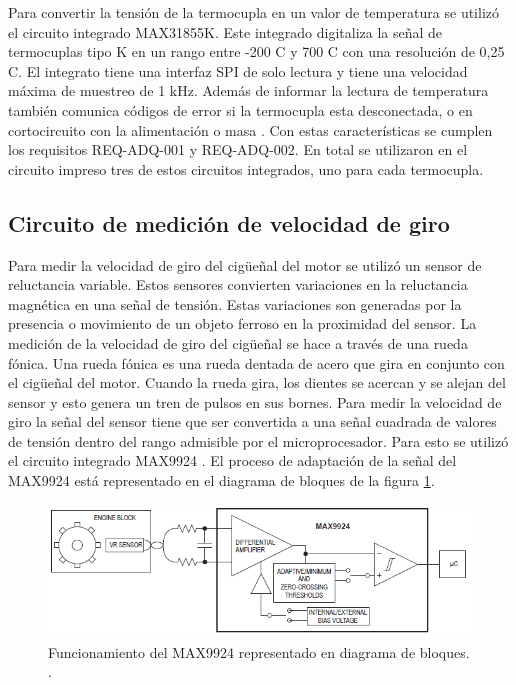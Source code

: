 Para convertir la tensión de la termocupla en un valor de temperatura se utilizó el circuito integrado MAX31855K. Este integrado digitaliza la señal de termocuplas tipo K en un rango entre -200 \degree C y 700 \degree C con una resolución de 0,25 \degree C. El integrato tiene una interfaz SPI de solo lectura y tiene una velocidad máxima de muestreo de 1 kHz. Además de informar la lectura de temperatura también comunica códigos de error si la termocupla esta desconectada, o en cortocircuito con la alimentación o masa \cite{MAX31855}. Con estas características se cumplen los requisitos REQ-ADQ-001 y REQ-ADQ-002. En total se utilizaron en el circuito impreso tres de estos circuitos integrados, uno para cada termocupla.

\subsection{Circuito de medición de velocidad de giro}

Para medir la velocidad de giro del cigüeñal del motor se utilizó un sensor de reluctancia variable. Estos sensores convierten variaciones en la reluctancia magnética en una señal de tensión. Estas variaciones son generadas por la presencia o movimiento de un objeto ferroso en la proximidad del sensor. La medición de la velocidad de giro del cigüeñal se hace a través de una rueda fónica. Una rueda fónica es una rueda dentada de acero que gira en conjunto con el cigüeñal del motor. Cuando la rueda gira, los dientes se acercan y se alejan del sensor y esto genera un tren de pulsos en sus bornes. Para medir la velocidad de giro la señal del sensor tiene que ser convertida a una señal cuadrada de valores de tensión dentro del rango admisible por el microprocesador. Para esto se utilizó el circuito integrado MAX9924 \cite{MAX9924}. El proceso de adaptación de la señal del MAX9924 está representado en el diagrama de bloques de la figura \ref{fig:bloq-rpm}.

\begin{figure}[htpb]
\centering
\includegraphics[width=.9\textwidth]{./Figures/max9924.png}
\caption{Funcionamiento del MAX9924 representado en diagrama de bloques. \protect\footnotemark[3].}
\label{fig:bloq-rpm}
\end{figure}


